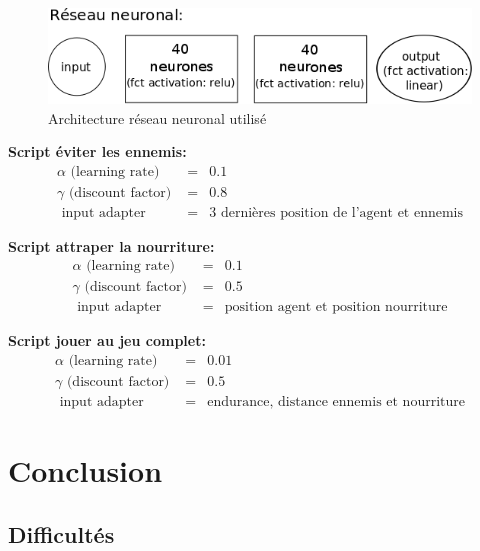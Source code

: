 \documentclass[11pt,a4paper]{report}
\begin{document}
   \begin{figure}[!h]
   \center
   \includegraphics[scale=0.45]{ressources/nn_model.png}
   \caption{Architecture réseau neuronal utilisé}
   \end{figure} 
   
   \textbf{Script éviter les ennemis:}
   \begin{eqnarray}
   \alpha \text{ (learning rate) } &=& 0.1 \\
   \gamma \text{ (discount factor) } &=& 0.8 \\
   \text{ input adapter } &=& \text{3 dernières position de l'agent et ennemis}
   \end{eqnarray}   
   
   \textbf{Script attraper la nourriture:}
   \begin{eqnarray}
   \alpha \text{ (learning rate) } &=& 0.1 \\
   \gamma \text{ (discount factor) } &=& 0.5 \\
   \text{ input adapter } &=& \text{position agent et position nourriture}
   \end{eqnarray}   
   
   \textbf{Script jouer au jeu complet:}
   \begin{eqnarray}
   \alpha \text{ (learning rate) } &=& 0.01 \\
   \gamma \text{ (discount factor) } &=& 0.5 \\
   \text{ input adapter } &=& \text{endurance, distance ennemis et nourriture}
   \end{eqnarray}   
  
  \chapter{Conclusion}
  
  \section{Difficultés}
  
\end{document}
